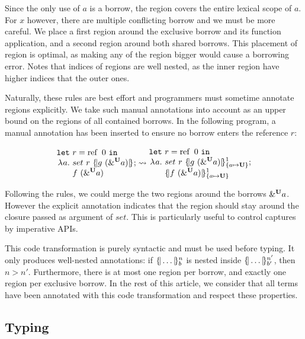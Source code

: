 Since the only use of $a$ is a borrow,
the region covers the entire lexical scope of $a$. For $x$ however, there are
multiple conflicting borrow and we must be more careful. We place a first
region around the exclusive borrow and its function application,
and a second region around both shared borrows. This placement of region
is optimal, as making any of the region bigger would cause a borrowing
error.
Notes that indices of regions are well nested, as the inner region have
higher indices that the outer ones.

Naturally, these rules are best effort and programmers must sometime
annotate regions explicitly. We take such manual annotations
into account as an upper bound on the regions of all contained borrows.
In the following program, a manual annotation has been inserted to ensure
no borrow enters the reference $r$:

\[
  \setlength{\jot}{-1pt}
  \RannotT{
\begin{aligned}
  \letin{&r}{\operatorname{ref}\ 0}{}\\
  \lam{a}{}\ &
  set\ r\ \region[]{}{g\ (\borrow[\kun]{a})};\\
  &f\ (\borrow[\kun]{a}) 
\end{aligned}
}{
\begin{aligned}
  \letin{&r}{\operatorname{ref}\ 0}{}\\
  \lam{a}{}\ &
  set\ r\ \region[1]{\Sone a\IBORROW}{g\ (\borrow[\kun]{a})};\\
  &\region[1]{\Sone a\IBORROW}{f\ (\borrow[\kun]{a})}
\end{aligned}
}
\]

Following the rules, we could merge the two regions around the borrows
$\borrow[\kun]{a}$. However
the explicit annotation indicates that the region should stay around the closure
passed as argument of $set$. This is particularly useful to control captures
by imperative APIs.

This code transformation is purely syntactic and must be used before
typing. It only produces well-nested annotations: if $\region[n]{b}{\dots}$
is nested inside $\region[n']{b'}{\dots}$, then $n > n'$. Furthermore, there
is at most one region per borrow, and exactly one region per exclusive borrow.
In the rest of this article, we consider
that all terms have been annotated with this code transformation and respect
these properties.

\subsection{Typing}
\label{sdtyping}

